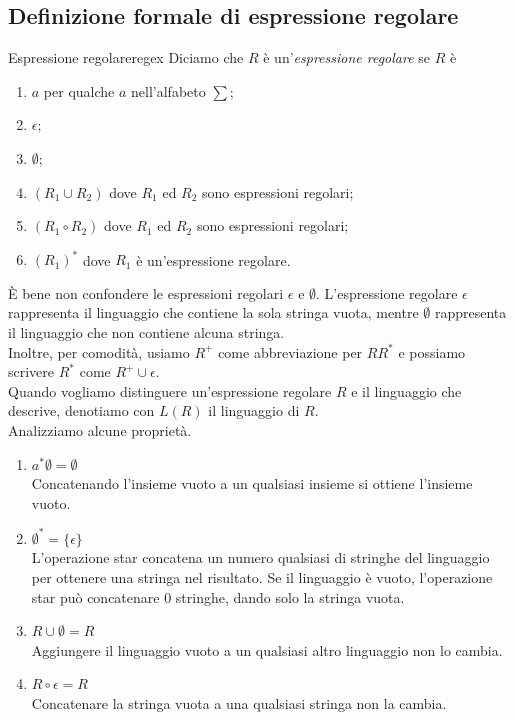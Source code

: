\documentclass[12pt]{report}
\newcounter{definition}
\newcommand{\nmu}{}
\begin{document}
	\subsection{Definizione formale di espressione regolare}
	\begin{definition}{\nmu Espressione regolare}{regex}
		Diciamo che $R$ è un'\textit{espressione regolare} se $R$ è
		\begin{enumerate}
			\item $a$ per qualche $a$ nell'alfabeto $\sum$;
			\item $\epsilon$;
			\item $\emptyset$;
			\item $(R_1 \cup R_2)$ dove $R_1$ ed $R_2$ sono espressioni regolari;
			\item $(R_1 \circ R_2)$ dove $R_1$ ed $R_2$ sono espressioni regolari;
			\item $(R_1)^*$ dove $R_1$ è un'espressione regolare.
		\end{enumerate}
	\end{definition}
	È bene non confondere le espressioni regolari $\epsilon$ e $\emptyset$. L'espressione regolare $\epsilon$ rappresenta il linguaggio che contiene la sola stringa vuota, mentre $\emptyset$ rappresenta il linguaggio che non contiene alcuna stringa. \\
	Inoltre, per comodità, usiamo $R^+$ come abbreviazione per $RR^*$ e possiamo scrivere $R^*$ come $R^+ \cup \epsilon$. \\
	Quando vogliamo distinguere un'espressione regolare $R$ e il linguaggio che descrive, denotiamo con $L(R)$ il linguaggio di $R$. \\
	Analizziamo alcune proprietà.
	\begin{enumerate}
		\item $a^*\emptyset = \emptyset$ \\
		Concatenando l'insieme vuoto a un qualsiasi insieme si ottiene l'insieme vuoto.
		\item $\emptyset^* = \{\epsilon\}$ \\
		L'operazione star concatena un numero qualsiasi di stringhe del linguaggio per ottenere una stringa nel risultato. Se il linguaggio è vuoto, l'operazione star può concatenare 0 stringhe, dando solo la stringa vuota.
		\item $R \cup \emptyset = R$ \\
		Aggiungere il linguaggio vuoto a un qualsiasi altro linguaggio non lo cambia.
		\item $R \circ \epsilon = R$ \\
		Concatenare la stringa vuota a una qualsiasi stringa non la cambia.
	\end{enumerate}
\end{document}
